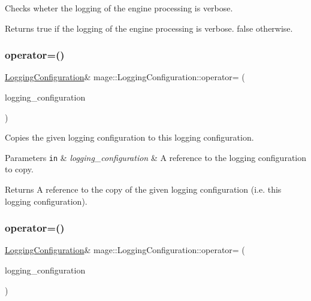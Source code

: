 Checks wheter the logging of the engine processing is verbose.

\begin{DoxyReturn}{Returns}
{\ttfamily true} if the logging of the engine processing is verbose. {\ttfamily false} otherwise. 
\end{DoxyReturn}
\hypertarget{structmage_1_1_logging_configuration_af35d0b0a2f5743944d3d9d66580074db}{}\label{structmage_1_1_logging_configuration_af35d0b0a2f5743944d3d9d66580074db} 
\subsubsection{\texorpdfstring{operator=()}{operator=()}\hspace{0.1cm}{\footnotesize\ttfamily [1/2]}}
{\footnotesize\ttfamily \hyperlink{structmage_1_1_logging_configuration}{Logging\+Configuration}\& mage\+::\+Logging\+Configuration\+::operator= (\begin{DoxyParamCaption}\item[{const \hyperlink{structmage_1_1_logging_configuration}{Logging\+Configuration} \&}]{logging\+\_\+configuration }\end{DoxyParamCaption})\hspace{0.3cm}{\ttfamily [default]}}

Copies the given logging configuration to this logging configuration.


\begin{DoxyParams}[1]{Parameters}
\mbox{\tt in}  & {\em logging\+\_\+configuration} & A reference to the logging configuration to copy. \\
\hline
\end{DoxyParams}
\begin{DoxyReturn}{Returns}
A reference to the copy of the given logging configuration (i.\+e. this logging configuration). 
\end{DoxyReturn}
\hypertarget{structmage_1_1_logging_configuration_a699285ff50d1bb7573cc0c28bcf476b1}{}\label{structmage_1_1_logging_configuration_a699285ff50d1bb7573cc0c28bcf476b1} 
\subsubsection{\texorpdfstring{operator=()}{operator=()}\hspace{0.1cm}{\footnotesize\ttfamily [2/2]}}
{\footnotesize\ttfamily \hyperlink{structmage_1_1_logging_configuration}{Logging\+Configuration}\& mage\+::\+Logging\+Configuration\+::operator= (\begin{DoxyParamCaption}\item[{\hyperlink{structmage_1_1_logging_configuration}{Logging\+Configuration} \&\&}]{logging\+\_\+configuration }\end{DoxyParamCaption})\hspace{0.3cm}{\ttfamily [default]}}

